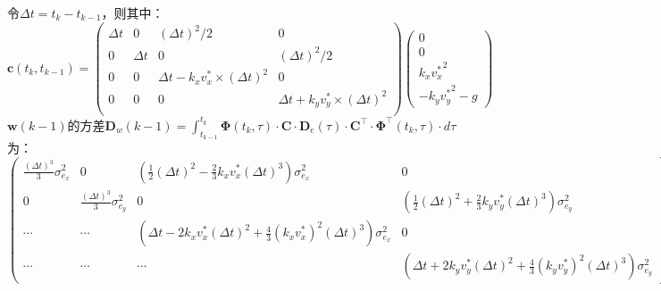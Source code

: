 \documentclass[12pt, onecolumn]{article}
\begin{document}
	令$\Delta t=t_k-t_{k-1}$，则其中：
	\begin{equation}
	\boldsymbol{c}(t_k,t_{k-1})=	\begin{pmatrix}
		\Delta t&0&(\Delta t)^2/2&0\\
		0&\Delta t&0&(\Delta t)^2/2\\
		0&0&\Delta t-k_x v_x^*\times(\Delta t)^2&0\\
		0&0&0&\Delta t+k_y v_y^*\times(\Delta t)^2\\
		\end{pmatrix}\begin{pmatrix}
		0\\0\\
		k_x{v_x^*}^2\\
		-k_y{v_y^*}^2-g
		\end{pmatrix}
	\end{equation}
	$\boldsymbol{w}(k-1)$的方差$\boldsymbol{D}_{w}(k-1)=\int_{t_{k-1}}^{t_k}\boldsymbol{\Phi}(t_k,\tau)\cdot\boldsymbol{C}\cdot\boldsymbol{D}_{e}(\tau)\cdot\boldsymbol{C}^\top\cdot\boldsymbol{\Phi}^\top(t_k,\tau)\cdot d\tau$为：
	\begin{equation}
	\begin{pmatrix}
	\frac{(\Delta t)^3}{3}\sigma_{e_x}^2
	&0&
	\left( \frac{1}{2}(\Delta t)^2-\frac{2}{3}k_xv_x^*(\Delta t)^3\right)\sigma_{e_x}^2 
	&0\\
	0&
	\frac{(\Delta t)^3}{3}\sigma_{e_y}^2
	&0&
	\left( \frac{1}{2}(\Delta t)^2+\frac{2}{3}k_yv_y^*(\Delta t)^3\right)\sigma_{e_y}^2 
	\\
	\cdots&\cdots&
	\left(\Delta t-2k_xv_x^*(\Delta t)^2+\frac{4}{3}(k_xv^*_x)^2(\Delta t)^3 \right) \sigma_{e_x}^2
	&0
	\\
	\cdots&\cdots&\cdots&
	\left(\Delta t+2k_yv_y^*(\Delta t)^2+\frac{4}{3}(k_yv^*_y)^2(\Delta t)^3 \right) \sigma_{e_y}^2
	\end{pmatrix}
	\end{equation}
	
\end{document}
